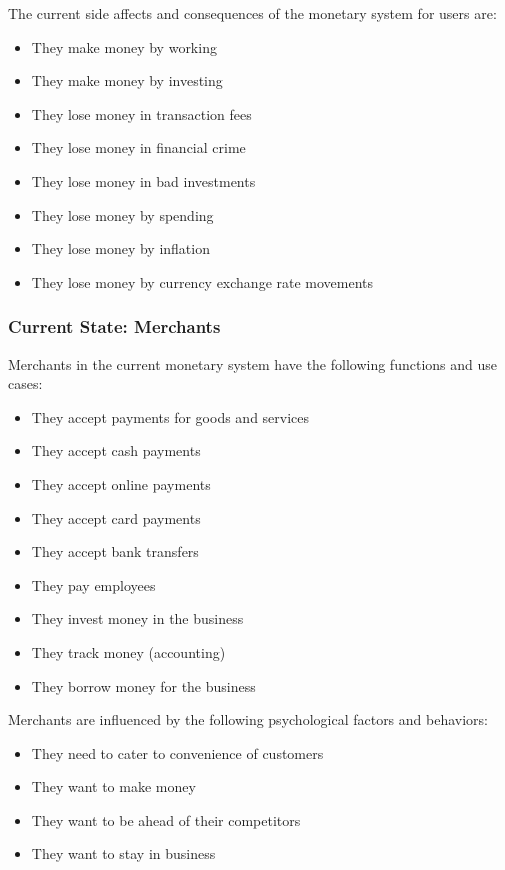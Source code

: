 \documentclass[a4paper,12pt]{article} %
\begin{document}
{The current side affects and consequences of the monetary system for users are:

\begin{itemize}
	\item They make money by working
	\item They make money by investing
	\item They lose money in transaction fees
	\item They lose money in financial crime
	\item They lose money in bad investments
	\item They lose money by spending
	\item They lose money by inflation
	\item They lose money by currency exchange rate movements
\end{itemize}

\subsubsection{Current State: Merchants} \label{sssec:4.3:merchants}

Merchants in the current monetary system have the following functions and use cases:

\begin{itemize}
	\item They accept payments for goods and services
	\item They accept cash payments
	\item They accept online payments
	\item They accept card payments
	\item They accept bank transfers
	\item They pay employees
	\item They invest money in the business
	\item They track money (accounting)
	\item They borrow money for the business
\end{itemize}

Merchants are influenced by the following psychological factors and behaviors:

\begin{itemize}
	\item They need to cater to convenience of customers
	\item They want to make money
	\item They want to be ahead of their competitors
	\item They want to stay in business
\end{itemize}

}
\end{document}

